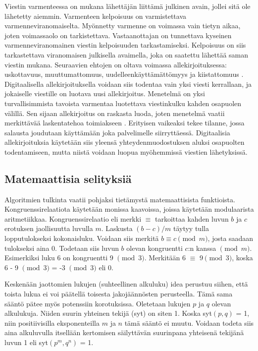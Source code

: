 \documentclass[finnish]{tktltiki2}
\theoremstyle{definition}
\theoremstyle{remark}
\begin{document}
Viestin varmenteessa on mukana lähettäjän liittämä julkinen avain, jollei sitä ole lähetetty aiemmin. Varmenteen kelpoisuus on varmistettava varmenneviranomaiselta. Myönnetty varmenne on voimassa vain tietyn aikaa, joten voimassaolo on tarkistettava. Vastaanottajan on tunnettava kyseinen varmenneviranomainen viestin kelpoisuuden tarkastamiseksi. Kelpoisuus on siis tarkastettava viranomaisen julkisella avaimella, joka on saatettu lähettää saman viestin mukana. Seuraavien ehtojen on oltava voimassa allekirjoituksessa: uskottavuus, muuttumattomuus, uudelleenkäyttämättömyys ja kiistattomuus \cite{e-c}. Digitaalisella allekirjoituksella voidaan siis todentaa vain yksi viesti kerrallaan, ja jokaiselle viestille on luotava uusi allekirjoitus. Menetelmä on yksi turvallisimmista tavoista varmentaa luotettava viestinkulku kahden osapuolen välillä. Sen sijaan allekirjoitus on raskasta luoda, joten menetelmä vaatii merkittävää laskentatehoa toimiakseen \cite{proxy}. Erityisen vaikeaksi tekee tilanne, jossa salausta joudutaan käyttämään joka palvelimelle siirryttäessä. Digitaalisia allekirjoituksia käytetään siis yleensä yhteydenmuodostuksen aluksi osapuolten todentamiseen, mutta niistä voidaan luopua myöhemmissä viestien lähetyksissä.

\subsection{Matemaattisia selityksiä}

Algoritmien tulkinta vaatii pohjaksi tietämystä matemaattisista funktioista. Kongruenssirelaatiota käytetään monissa kaavoissa, joissa käytetään modulaarista aritmetiikkaa. Kongruenssirelaatio eli merkki $\equiv$ tarkoittaa kahden luvun $b$ ja $c$ erotuksen jaollisuutta luvulla $m$. Laskusta $(b - c)/m$ täytyy tulla lopputulokseksi kokonaisluku. Voidaan siis merkitä $b \equiv c \pmod{m}$, josta saadaan tulokseksi aina 0. Todetaan siis luvun $b$ olevan kongruentti $c$:n kanssa $\pmod{m}$. Esimerkiksi luku 6 on kongruentti 9 $\pmod{3}$. Merkitään 6 $\equiv $ 9$ \pmod{3}$, koska 6 - 9 $\pmod{3}$ = -3 $\pmod{3}$ eli 0. \cite{cong}

Keskenään jaottomien lukujen (suhteellinen alkuluku) idea perustuu siihen, että toista lukua ei voi päätellä toisesta jakojäännösten perusteella. Tämä sama sääntö pätee myös potenssiin korotuksissa. Oletetaan lukujen $p$ ja $q$ olevan alkulukuja. Niiden suurin yhteinen tekijä (syt) on siten 1. Koska syt$(p, q)$ = 1, niin positiivisilla eksponenteilla $m$ ja $n$ tämä sääntö ei muutu. Voidaan todeta siis aina alkuluvulla itsellään kertomisen säilyttävän suurinpana yhteisenä tekijänä luvun 1 eli syt$(p^m, q^n)$ = 1. \cite{rel}  
\end{document}

